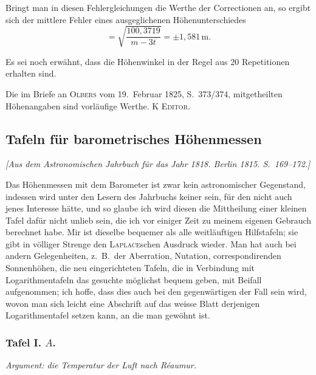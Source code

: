 \documentclass[12pt,a4paper]{article}
\theoremstyle{plain}
\theoremstyle{definition}
\theoremstyle{remark}
\begin{document}
Bringt man in diesen Fehlergleichungen die Werthe der Correctionen an, so ergibt sich der mittlere Fehler eines ausgeglichenen H\"ohenunterschiedes
\[
= \sqrt{\frac{100{,}3719}{m - 3t}} = \pm 1{,}581\,\text{m}.
\]

Es sei noch erw\"ahnt, dass die H\"ohenwinkel in der Regel aus 20 Repetitionen erhalten sind.

Die im Briefe an \textsc{Olbers} vom 19.~Februar 1825, S.~373/374, mitgetheilten H\"ohenangaben sind vorl\"aufige Werthe.
\hfill\textsc{K Editor.}

\vspace{1em}

\subsection*{Tafeln f\"ur barometrisches H\"ohenmessen}

\noindent
\textit{[Aus dem Astronomischen Jahrbuch f\"ur das Jahr 1818. Berlin 1815. S.~169--172.]}

\medskip
\noindent
Das H\"ohenmessen mit dem Barometer ist zwar kein astronomischer Gegenstand, indessen wird unter den Lesern des Jahrbuchs keiner sein, f\"ur den nicht auch jenes Interesse h\"atte, und so glaube ich wird diesen die Mittheilung einer kleinen Tafel daf\"ur nicht unlieb sein, die ich vor einiger Zeit zu meinem eigenen Gebrauch berechnet habe. Mir ist dieselbe bequemer als alle weitl\"auftigen Hilfstafeln; sie gibt in v\"olliger Strenge den \textsc{Laplace}schen Ausdruck wieder. Man hat auch bei andern Gelegenheiten, z.~B.\ der Aberration, Nutation, correspondirenden Sonnenh\"ohen, die neu eingerichteten Tafeln, die in Verbindung mit Logarithmentafeln das gesuchte m\"oglichst bequem geben, mit Beifall aufgenommen; ich hoffe, dass dies auch bei den gegenw\"artigen der Fall sein wird, wovon man sich leicht eine Abschrift auf das weisse Blatt derjenigen Logarithmentafel setzen kann, an die man gew\"ohnt ist.

\subsubsection*{Tafel I. $A$.}
\textit{Argument: die Temperatur der Luft nach R\'eaumur.}
\end{document}
